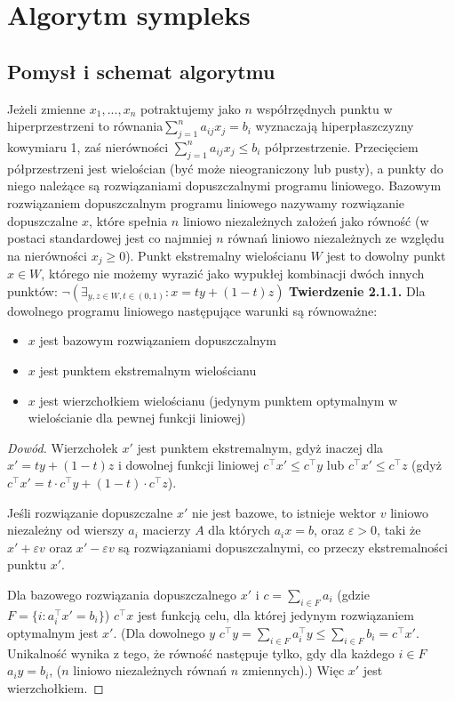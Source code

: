 \documentclass[licencjacka]{pracamgr}
\begin{document}
\chapter{Algorytm sympleks}\label{r:simpleks}
  \section{Pomysł i schemat algorytmu}
Jeżeli zmienne $x_1,...,x_n$ potraktujemy jako $n$ współrzędnych punktu w hiperprzestrzeni to równania$\sum\limits_{j=1}^{n}a_{ij}x_j=b_i$ wyznaczają hiperpłaszczyzny kowymiaru 1,
zaś nierówności $\sum\limits_{j=1}^{n}a_{ij}x_j\le b_i$ półprzestrzenie. Przecięciem półprzestrzeni jest wielościan (być może nieograniczony lub pusty),
a punkty do niego należące są rozwiązaniami dopuszczalnymi programu liniowego.
Bazowym rozwiązaniem dopuszczalnym programu liniowego nazywamy rozwiązanie dopuszczalne $x$, które spełnia $n$ liniowo niezależnych założeń jako równość
(w postaci standardowej jest co najmniej $n$ równań liniowo niezależnych ze względu na nierówności $x_j\ge0$).\newline
Punkt ekstremalny wielościanu $W$ jest to dowolny punkt $x\in W$, którego nie możemy wyrazić jako wypukłej kombinacji dwóch innych punktów:
$\neg\left(\exists_{y,z\in W,t\in(0,1)} : x=ty+(1-t)z\right)$\newline\newline
%
\textbf{Twierdzenie 2.1.1.} Dla dowolnego programu liniowego następujące warunki są równoważne:
\begin{itemize}
\item $x$ jest bazowym rozwiązaniem dopuszczalnym
\item $x$ jest punktem ekstremalnym wielościanu
\item $x$ jest wierzchołkiem wielościanu (jedynym punktem optymalnym w wielościanie dla pewnej funkcji liniowej)
\end{itemize}
\begin{proof}[Dowód]

Wierzchołek $x'$ jest punktem ekstremalnym, gdyż inaczej dla $x'=ty+(1-t)z$ i dowolnej funkcji liniowej $c^{\top}x'\le c^{\top}y$ lub $c^{\top}x'\le c^{\top}z$
(gdyż $c^{\top}x'=t\cdot c^{\top}y+(1-t)\cdot c^{\top}z$).

Jeśli rozwiązanie dopuszczalne $x'$ nie jest bazowe, to istnieje wektor $v$ liniowo niezależny od wierszy $a_i$ macierzy $A$
dla których $a_ix=b$, oraz $\varepsilon>0$,
taki że $x'+\varepsilon v$ oraz $x'-\varepsilon v$ są rozwiązaniami dopuszczalnymi, co przeczy ekstremalności punktu $x'$.

Dla bazowego rozwiązania dopuszczalnego $x'$ i $c=\sum\limits_{i\in F}a_i$ (gdzie $F=\{i: a_i^{\top}x'=b_i\}$) $c^{\top}x$ jest funkcją celu,
dla której jedynym rozwiązaniem optymalnym jest $x'$.
(Dla dowolnego $y$ $c^{\top}y=\sum\limits_{i\in F}a_i^{\top}y\le\sum\limits_{i\in F}b_i=c^{\top}x'$.
Unikalność wynika z tego, że równość następuje tylko, gdy dla każdego $i\in F$ $a_iy=b_i$,
($n$ liniowo niezależnych równań $n$ zmiennych).) Więc $x'$ jest wierzchołkiem.
\end{proof}
\end{document}
